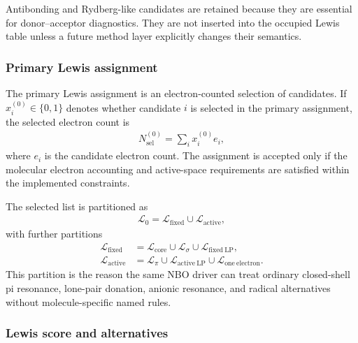 \documentclass[11pt]{article}
\begin{document}
Antibonding and Rydberg-like candidates are retained because they are essential for donor--acceptor diagnostics.  They are not inserted into the occupied Lewis table unless a future method layer explicitly changes their semantics.

\subsubsection*{Primary Lewis assignment}

The primary Lewis assignment is an electron-counted selection of candidates.  If $x_i^{(0)}\in\{0,1\}$ denotes whether candidate $i$ is selected in the primary assignment, the selected electron count is
\begin{equation}
\begin{aligned}
	N_{\mathrm{sel}}^{(0)} = \sum_i x_i^{(0)} e_i,
\end{aligned}
\end{equation}
where $e_i$ is the candidate electron count.  The assignment is accepted only if the molecular electron accounting and active-space requirements are satisfied within the implemented constraints.

The selected list is partitioned as
\begin{equation}
\begin{aligned}
	\mathcal{L}_0
	= \mathcal{L}_{\mathrm{fixed}}
	\cup \mathcal{L}_{\mathrm{active}},
\end{aligned}
\end{equation}
with further partitions
\begin{equation}
\begin{aligned}
	\mathcal{L}_{\mathrm{fixed}}
	&= \mathcal{L}_{\mathrm{core}}
	\cup \mathcal{L}_{\sigma}
	\cup \mathcal{L}_{\mathrm{fixed\ LP}}, \\
	\mathcal{L}_{\mathrm{active}}
	&= \mathcal{L}_{\pi}
	\cup \mathcal{L}_{\mathrm{active\ LP}}
	\cup \mathcal{L}_{\mathrm{one\ electron}}.
\end{aligned}
\end{equation}
This partition is the reason the same NBO driver can treat ordinary closed-shell pi resonance, lone-pair donation, anionic resonance, and radical alternatives without molecule-specific named rules.

\subsubsection*{Lewis score and alternatives}
\end{document}
